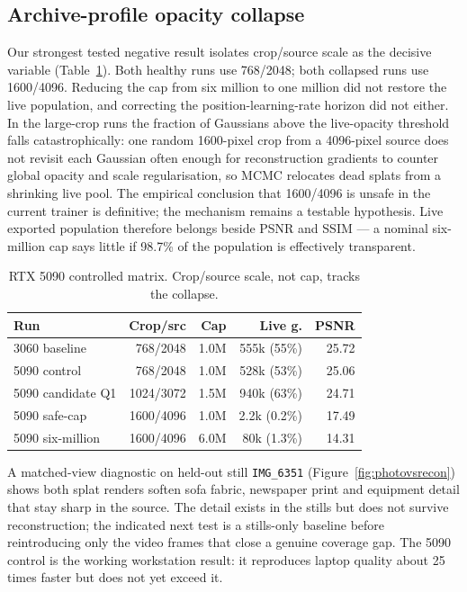 \subsection{Archive-profile opacity collapse}
Our strongest tested negative result isolates crop/source scale as the decisive variable
(Table~\ref{tab:collapse}). Both healthy runs use 768/2048; both collapsed runs use 1600/4096.
Reducing the cap from six million to one million did not restore the live population, and
correcting the position-learning-rate horizon did not either. In the large-crop runs the
fraction of Gaussians above the live-opacity threshold falls catastrophically: one random
1600-pixel crop from a 4096-pixel source does not revisit each Gaussian often enough for
reconstruction gradients to counter global opacity and scale regularisation, so MCMC relocates
dead splats from a shrinking live pool. The empirical conclusion that 1600/4096 is unsafe in the
current trainer is definitive; the mechanism remains a testable hypothesis. Live exported
population therefore belongs beside PSNR and SSIM --- a nominal six-million cap says little if
98.7\% of the population is effectively transparent.

\begin{table}[t]
\centering\small
\caption{RTX 5090 controlled matrix. Crop/source scale, not cap, tracks the collapse.
}
\label{tab:collapse}
\setlength{\tabcolsep}{3pt}
\begin{tabular}{@{}lrrrr@{}}
\toprule
Run & Crop/src & Cap & Live g. & PSNR \\
\midrule
3060 baseline    & 768/2048  & 1.0M & 555k (55\%)  & 25.72 \\
5090 control     & 768/2048  & 1.0M & 528k (53\%)  & 25.06 \\
5090 candidate Q1& 1024/3072 & 1.5M & 940k (63\%)  & 24.71 \\
5090 safe-cap    & 1600/4096 & 1.0M & 2.2k (0.2\%) & 17.49 \\
5090 six-million & 1600/4096 & 6.0M & 80k (1.3\%)  & 14.31 \\
\bottomrule
\end{tabular}
\end{table}

A matched-view diagnostic on held-out still \texttt{IMG\_6351} (Figure~\ref{fig:photovsrecon}) shows both splat renders soften
sofa fabric, newspaper print and equipment detail that stay sharp in the source. The detail
exists in the stills but does not survive reconstruction; the indicated next test is a
stills-only baseline before reintroducing only the video frames that close a genuine coverage
gap. The 5090 control is the working workstation result: it reproduces laptop quality about 25 times
faster but does not yet exceed it.

